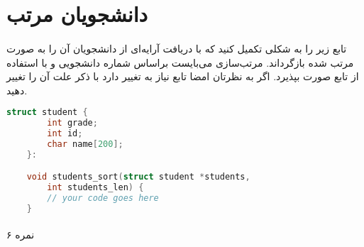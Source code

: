 \documentclass[../main.tex]{subfiles}
\begin{document}
\section{دانشجویان مرتب}
\paragraph{}
تابع زیر را به شکلی تکمیل کنید که با دریافت آرایه‌ای از دانشجویان
آن را به صورت مرتب شده بازگرداند.
مرتب‌سازی می‌بایست براساس شماره دانشجویی و با استفاده از تابع
صورت بپذیرد.
اگر به نظرتان امضا تابع نیاز به تغییر دارد با ذکر علت آن را تغییر دهید.

\begin{latin}
\begin{lstlisting}[language=c]
    struct student {
        int grade;
        int id;
        char name[200];
    }:

    void students_sort(struct student *students,
        int students_len) {
        // your code goes here
    }
\end{lstlisting}
\end{latin}

\paragraph{}
۶ نمره
\end{document}
